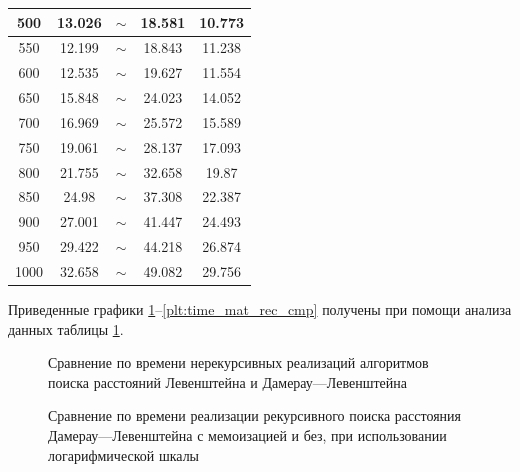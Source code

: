 \begin{table}[!ht]
\begin{tabular}{|c|c|c|c|c|}
		500  & 13.026             & $\sim$                & 18.581                      & 10.773                 \\ \hline
		550  & 12.199             & $\sim$                & 18.843                      & 11.238                 \\ \hline
		600  & 12.535             & $\sim$                & 19.627                      & 11.554                 \\ \hline
		650  & 15.848             & $\sim$                & 24.023                      & 14.052                 \\ \hline
		700  & 16.969             & $\sim$                & 25.572                      & 15.589                 \\ \hline
		750  & 19.061             & $\sim$                & 28.137                      & 17.093                 \\ \hline
		800  & 21.755             & $\sim$                & 32.658                      & 19.87                  \\ \hline
		850  & 24.98              & $\sim$                & 37.308                      & 22.387                 \\ \hline
		900  & 27.001             & $\sim$                & 41.447                      & 24.493                 \\ \hline
		950  & 29.422             & $\sim$                & 44.218                      & 26.874                 \\ \hline
		1000 & 32.658             & $\sim$                & 49.082                      & 29.756                \\ \hline
	\end{tabular}
	\label{t:timings}
\end{table}





 Приведенные  графики \ref{plt:time_matrix_cmp}--\ref{plt:time_mat_rec_cmp}  получены при 
помощи анализа данных таблицы \ref{t:timings}.

\begin{figure}[H]
	\centering
	
	\caption{Сравнение по времени нерекурсивных реализаций алгоритмов поиска расстояний Левенштейна и Дамерау---Левенштейна}
	\label{plt:time_matrix_cmp}
\end{figure}




\begin{figure}[H]
	\centering
	
	\caption{Сравнение по времени реализации рекурсивного поиска расстояния Дамерау---Левенштейна с мемоизацией и без, при использовании логарифмической шкалы}
	\label{plt:time_rec_cmp}
\end{figure}


